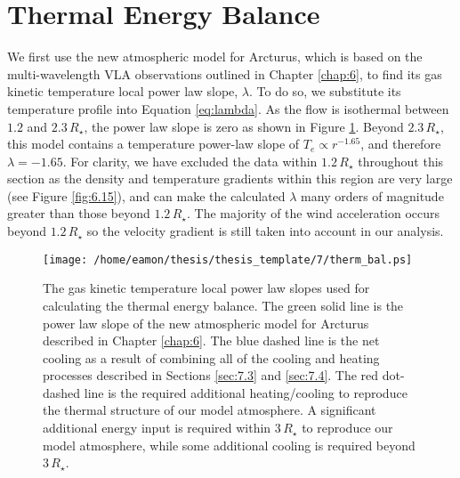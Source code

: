 \section{Thermal Energy Balance}\label{sec:7.5}
We first use the new atmospheric model for Arcturus, which is based on the multi-wavelength VLA observations outlined in Chapter \ref{chap:6}, to find its gas kinetic temperature local power law slope, $\lambda$. To do so, we substitute its temperature profile into Equation \ref{eq:lambda}. As the flow is isothermal between $1.2$ and $2.3\,R_{\star}$, the power law slope is zero as shown in Figure \ref{fig:7.6}. Beyond $2.3\,R_{\star}$, this model contains a temperature power-law slope of $T_e \propto r^{-1.65}$, and therefore $\lambda = -1.65$. For clarity, we have excluded the data within $1.2\,R_{\star}$ throughout this section as the density and temperature gradients within this region are very large (see Figure \ref{fig:6.15}), and can make the calculated $\lambda$ many orders of magnitude greater than those beyond $1.2\,R_{\star}$. The majority of the wind acceleration occurs beyond $1.2\,R_{\star}$ so the velocity gradient is still taken into account in our analysis.

\begin{figure}[!ht]
\centering 
         \texttt{[image: /home/eamon/thesis/thesis\_template/7/therm\_bal.ps]}
\caption[Net thermal balance]{The gas kinetic temperature local power law slopes used for calculating the thermal energy balance. The green solid line is the power law slope of the new atmospheric model for Arcturus described in Chapter \ref{chap:6}. The blue dashed line is the net cooling as a result of combining all of the cooling and heating processes described in Sections \ref{sec:7.3} and \ref{sec:7.4}. The red dot-dashed line is the required additional heating/cooling to reproduce the thermal structure of our model atmosphere. A significant additional energy input is required within $3\,R_{\star}$ to reproduce our model atmosphere, while some additional cooling is required beyond $3\,R_{\star}$. }
\label{fig:7.6}
\end{figure}

